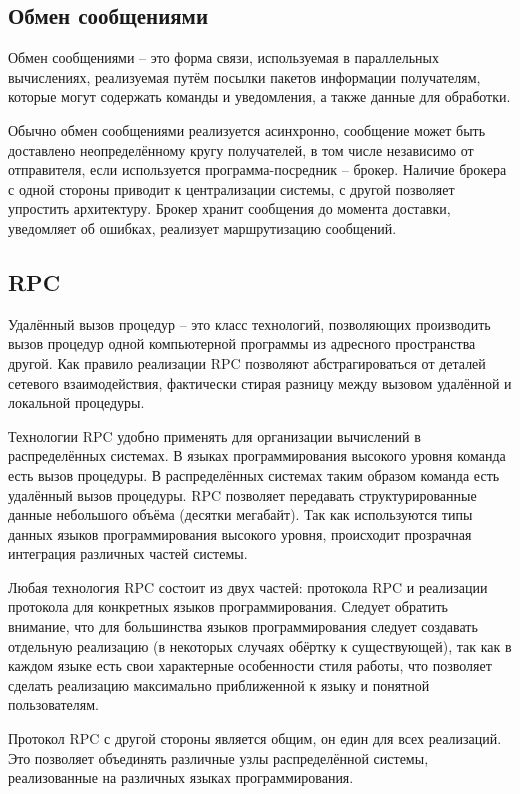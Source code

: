 \subsection{Обмен сообщениями}
Обмен сообщениями -- это форма связи, используемая в параллельных вычислениях,
реализуемая путём посылки пакетов информации получателям, которые могут
содержать команды и уведомления, а также данные для обработки.

Обычно обмен сообщениями реализуется асинхронно, сообщение может быть доставлено
неопределённому кругу получателей, в том числе независимо от отправителя,
если используется программа-посредник -- брокер. Наличие брокера с одной стороны
приводит к централизации системы, с другой позволяет упростить архитектуру.
Брокер хранит сообщения до момента доставки, уведомляет об ошибках,
реализует маршрутизацию сообщений.

\subsection{RPC}
Удалённый вызов процедур -- это класс технологий, позволяющих производить
вызов процедур одной компьютерной программы из адресного пространства другой.
Как правило реализации RPC позволяют абстрагироваться от деталей сетевого
взаимодействия, фактически стирая разницу между вызовом удалённой и локальной
процедуры.

Технологии RPC удобно применять для организации вычислений в распределённых
системах. В языках программирования высокого уровня команда есть вызов процедуры.
В распределённых системах таким образом команда есть удалённый вызов процедуры.
RPC позволяет передавать структурированные данные небольшого объёма (десятки
мегабайт). Так как используются типы данных языков программирования высокого
уровня, происходит прозрачная интеграция различных частей системы.

Любая технология RPC состоит из двух частей: протокола RPC и
реализации протокола для конкретных языков программирования. Следует обратить
внимание, что для большинства языков программирования следует создавать
отдельную реализацию (в некоторых случаях обёртку к существующей),
так как в каждом языке есть свои характерные особенности стиля работы,
что позволяет сделать реализацию максимально приближенной к языку и понятной
пользователям.

Протокол RPC с другой стороны является общим, он един для всех реализаций.
Это позволяет объединять различные узлы распределённой системы, реализованные
на различных языках программирования.

